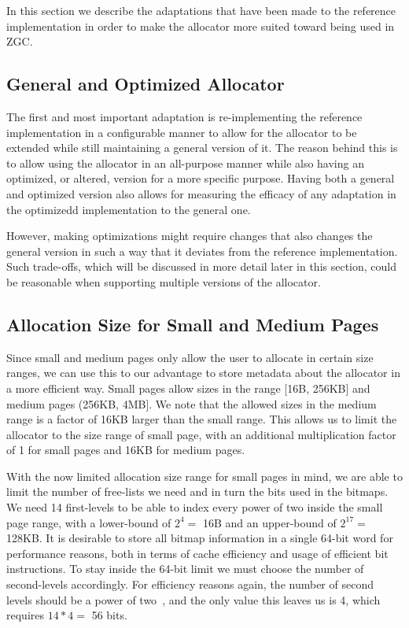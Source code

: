 
In this section we describe the adaptations that have been made to the reference implementation in order to make the allocator more suited toward being used in ZGC.

\subsection{General and Optimized Allocator}

The first and most important adaptation is re-implementing the reference implementation in a configurable manner to allow for the allocator to be extended while still maintaining a general version of it. The reason behind this is to allow using the allocator in an all-purpose manner while also having an optimized, or altered, version for a more specific purpose. Having both a general and optimized version also allows for measuring the efficacy of any adaptation in the optimizedd implementation to the general one.

However, making optimizations might require changes that also changes the general version in such a way that it deviates from the reference implementation. Such trade-offs, which will be discussed in more detail later in this section, could be reasonable when supporting multiple versions of the allocator.

\subsection{Allocation Size for Small and Medium Pages}

Since small and medium pages only allow the user to allocate in certain size ranges, we can use this to our advantage to store metadata about the allocator in a more efficient way. Small pages allow sizes in the range [16B, 256KB] and medium pages (256KB, 4MB]. We note that the allowed sizes in the medium range is a factor of 16KB larger than the small range. This allows us to limit the allocator to the size range of small page, with an additional multiplication factor of 1 for small pages and 16KB for medium pages.

With the now limited allocation size range for small pages in mind, we are able to limit the number of free-lists we need and in turn the bits used in the bitmaps. We need 14 first-levels to be able to index every power of two inside the small page range, with a lower-bound of $2^4 =$ 16B and an upper-bound of $2^{17} =$ 128KB. It is desirable to store all bitmap information in a single 64-bit word for performance reasons, both in terms of cache efficiency and usage of efficient bit instructions. To stay inside the 64-bit limit we must choose the number of second-levels accordingly. For efficiency reasons again, the number of second levels should be a power of two~\cite{TLSF}, and the only value this leaves us is 4, which requires $14 * 4 =$ 56 bits.

